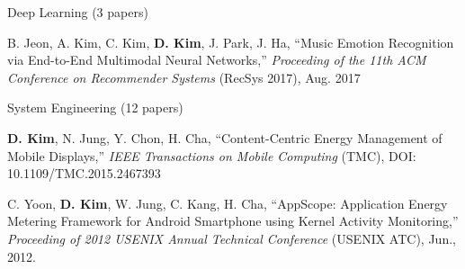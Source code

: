 

\begin{cventries}
    \cvacademicentry
        {Deep Learning (3 papers)} %
        {} %
        { %
            \begin{cvitems}
                \item {\small B. Jeon, A. Kim, C. Kim, \textbf{D. Kim}, J. Park, J. Ha, ``Music Emotion Recognition via End-to-End Multimodal Neural Networks,'' {\em Proceeding of the 11th ACM Conference on Recommender Systems} (RecSys 2017), Aug. 2017}
            \end{cvitems}
        }

    \cvacademicentry
        {System Engineering (12 papers)} %
        {} %
        { %
            \begin{cvitems}
                \item {\small \textbf{D. Kim}, N. Jung, Y. Chon, H. Cha, ``Content-Centric Energy Management of Mobile Displays,'' {\em IEEE Transactions on Mobile Computing} (TMC), DOI: 10.1109/TMC.2015.2467393}
                \item {\small C. Yoon, \textbf{D. Kim}, W. Jung, C. Kang, H. Cha, ``AppScope: Application Energy Metering Framework for Android Smartphone using Kernel Activity Monitoring,'' {\em Proceeding of 2012 USENIX Annual Technical Conference} (USENIX ATC), Jun., 2012.}
            \end{cvitems}
        }
\end{cventries}